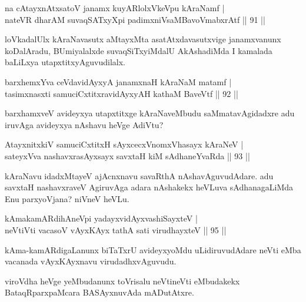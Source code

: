 \begin{shl}
na cAtayxnAtxsatoV janamx kuyARlolxVkeV\s pu kAraNamf |\\
nateVR dharAM suvaqSATxyX\s pi padimxniVsaMBavoV\s mabxrAtf \hfill || 91 ||
\end{shl}

\begin{artha}
loVkadalUlx kAraNavasutx aMtayxMta asatAtxdavasutxvige janamxvanunx koDalAradu, BUmiyalalxde suvaqSiTxyiMdalU AkAshadiMda I kamalada baLiLxya utapxtitxyAguvudilalx.
\end{artha}

\begin{shl}
barxhemxYva ceVdavidAyxyA janamxnaH kAraNaM matamf |\\
tasimxnasxti samuciCxtitxravidAyxyAH kathaM BaveVtf \hfill || 92 ||
\end{shl}

\begin{artha}
barxhamxveV avideyxya  utapxtitxge kAraNaveMbudu saMmatavAgidadxre adu iruvAga avideyxya nAshavu heVge AdiVtu?
\end{artha}

\begin{shl}
AtayxnitxkiV samuciCxtitxH sAyxcecxVnomxVhasayx kAraNeV |\\
sateyxVva nashavxrasAyxsayx savxtaH kiM sAdhaneYvaRda \hfill || 93 ||
\end{shl}

\begin{artha}
kAraNavu idadxMtayeV ajAcnxnavu savaRthA nAshavAguvudAdare. adu savxtaH nashavxraveV AgiruvAga adara nAshakekx heVLuva sAdhanagaLiMda Enu parxyoVjana? niVneV heVLu.
\end{artha}


\begin{shl}
kAmakamARdihAneV\s pi yadayxvidAyx\s vashiSayxteV |\\
neVtiVti vacasoV vAyxKAyx tathA sati virudhayxteV \hfill || 95 ||
\end{shl}

\begin{artha}
kAma-kamARdigaLanunx biTaTxrU avideyxyoMdu uLidiruvudAdare neVti eMba vacanada vAyxKAyxnavu virudadhxvAguvudu.
\end{artha}

\begin{artha}
viroVdha heVge yeMbudanunx toVrisalu neVtineVti eMbudakekx BataqRparxpaMcara BASAyxnuvAda mADutAtxre.
\end{artha}

